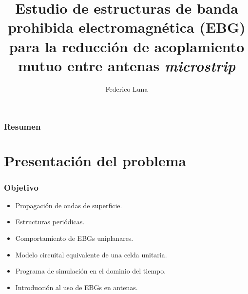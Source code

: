 \documentclass{beamer}
\title[Tesis de grado]{Estudio de estructuras de banda prohibida electromagnética (EBG) para la reducción de acoplamiento mutuo entre antenas \textit{microstrip}} %
\author{Federico Luna} %
\institute[] %
{
Facultad de Ingeniería,\\
Universidad de Buenos Aires \\ %
\medskip
\textit{fluna@fi.uba.ar}\\
\medskip %
Tutores: Dr. Ing. W. Gustavo Fano y Mg. Ing. Silvina Boggi
}
\date{} %
\begin{document}
\begin{frame}
\titlepage %
\end{frame}

\begin{frame}
\frametitle{Resumen} %
\tableofcontents[hideallsubsections] %
\end{frame}


\section{Presentación del problema} %
		\begin{frame}
			\frametitle{Objetivo}
			
			\begin{itemize}
				\item Propagación de ondas de superficie.
				\item Estructuras periódicas.
				\item Comportamiento de EBGs uniplanares.
				\item Modelo circuital equivalente de una celda unitaria.
				\item Programa de simulación en el dominio del tiempo.
				\item Introducción al uso de EBGs en antenas.
			\end{itemize}
		\end{frame}
	
\end{document}
